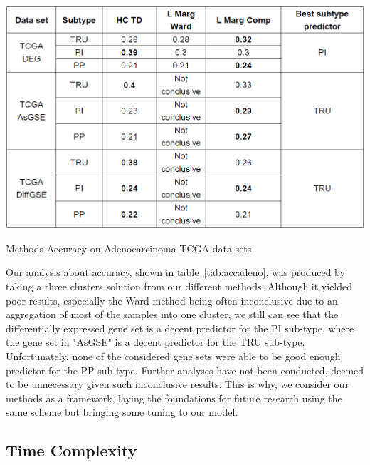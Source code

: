 \documentclass[twocolumn,12pt]{article}
\begin{document}
\begin{table}[!]
    \centering
    \includegraphics[scale=0.3]{img/AccAdeno.png}
    \caption{Methods Accuracy on Adenocarcinoma TCGA data sets}
    \label{tab:accadeno}
\end{table}
Our analysis about accuracy, shown in table~\ref{tab:accadeno}, was produced by taking a three clusters solution from our different methods.
Although it yielded poor results, especially the Ward method being often inconclusive due to an aggregation of most of the samples into one cluster, we still can see that the differentially expressed gene set is a decent predictor for the PI sub-type, where the gene set in "AsGSE" is a decent predictor for the TRU sub-type. Unfortunately, none of the considered gene sets were able to be good enough predictor for the PP sub-type.
Further analyses have not been conducted, deemed to be unnecessary given such inconclusive results.
This is why, we consider our methods as a framework, laying the foundations for future research using the same scheme but bringing some tuning to our model.

\subsection{Time Complexity}\label{sec:tps}
\end{document}
